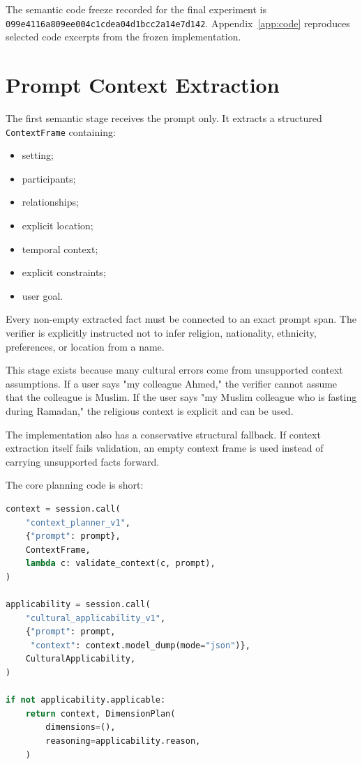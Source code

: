 The semantic code freeze recorded for the final experiment is \texttt{099e4116a809ee004c1cdea04d1bcc2a14e7d142}. Appendix~\ref{app:code} reproduces selected code excerpts from the frozen implementation.
\section{Prompt Context Extraction}

The first semantic stage receives the prompt only. It extracts a structured \texttt{ContextFrame} containing:

\begin{itemize}
\item setting;
\item participants;
\item relationships;
\item explicit location;
\item temporal context;
\item explicit constraints;
\item user goal.
\end{itemize}

Every non-empty extracted fact must be connected to an exact prompt span. The verifier is explicitly instructed not to infer religion, nationality, ethnicity, preferences, or location from a name.

This stage exists because many cultural errors come from unsupported context assumptions. If a user says "my colleague Ahmed," the verifier cannot assume that the colleague is Muslim. If the user says "my Muslim colleague who is fasting during Ramadan," the religious context is explicit and can be used.

The implementation also has a conservative structural fallback. If context extraction itself fails validation, an empty context frame is used instead of carrying unsupported facts forward.

The core planning code is short:

\begin{lstlisting}[language=Python,caption={Prompt context and applicability planning from src/cultverify/planner.py.}]
context = session.call(
    "context_planner_v1",
    {"prompt": prompt},
    ContextFrame,
    lambda c: validate_context(c, prompt),
)

applicability = session.call(
    "cultural_applicability_v1",
    {"prompt": prompt,
     "context": context.model_dump(mode="json")},
    CulturalApplicability,
)

if not applicability.applicable:
    return context, DimensionPlan(
        dimensions=(),
        reasoning=applicability.reason,
    )
\end{lstlisting}

